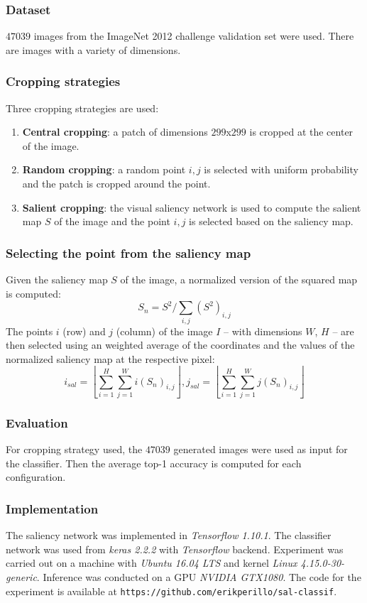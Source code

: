 \documentclass[English]{style/ic-tese-v3}
\begin{document}
\subsubsection{Dataset}
$47039$ images from the ImageNet 2012 challenge validation set were used.
There are images with a variety of dimensions.

\subsubsection{Cropping strategies}
Three cropping strategies are used:
\begin{enumerate}
    \item \textbf{Central cropping}: a patch of dimensions $299$x$299$ is cropped at the center of the image.
    \item \textbf{Random cropping}: a random point $i, j$ is selected with uniform probability and the
        patch is cropped around the point.
    \item \textbf{Salient cropping}:
        the visual saliency network is used to compute the salient map $S$ of the image
        and the point $i, j$ is selected based on the saliency map.
\end{enumerate}

\subsubsection{Selecting the point from the saliency map}
Given the saliency map $S$ of the image, a normalized version of the squared map is computed:
$$S_n = S^2/\sum\limits_{i,j}\left({S^2}\right)_{i,j}$$
The points $i$ (row) and $j$ (column) of the image $I$ -- with dimensions $W$, $H$ --
are then selected using an weighted average of the coordinates and the values of the normalized saliency map
at the respective pixel:
$$i_{sal} = \left\lfloor \sum\limits_{i=1}^H\sum\limits_{j=1}^W i\left(S_n\right)_{i,j} \right\rfloor,
  j_{sal} = \left\lfloor \sum\limits_{i=1}^H\sum\limits_{j=1}^W j\left(S_n\right)_{i,j} \right\rfloor$$

\subsubsection{Evaluation}
For cropping strategy used, the $47039$ generated images were used as input for the classifier.
Then the average top-1 accuracy is computed for each configuration.

\subsubsection{Implementation}
The saliency network was implemented in \emph{Tensorflow 1.10.1}.
The classifier network was used from \emph{keras 2.2.2} with \emph{Tensorflow} backend.
Experiment was carried out on a machine with \emph{Ubuntu 16.04 LTS} and kernel \emph{Linux 4.15.0-30-generic}.
Inference was conducted on a GPU \emph{NVIDIA GTX1080}.
The code for the experiment is available at \texttt{https://github.com/erikperillo/sal-classif}.
\end{document}
